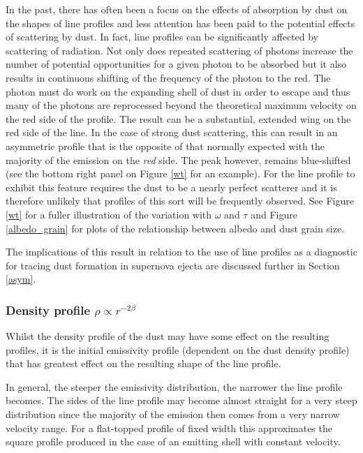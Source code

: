 \documentclass[useAMS,usenatbib,usegraphicx]{mnras}
\begin{document}
In the past, there has often been a focus on the effects of absorption by dust 
on the shapes of line profiles and less attention has been paid to the 
potential effects of scattering by dust.  In fact, line profiles 
can be significantly affected by scattering of radiation.  Not only does 
repeated scattering of photons increase the number of potential 
opportunities for a given photon to be absorbed but it also results in 
continuous shifting of the frequency of the photon to the red.  The photon 
must do work on the expanding shell of dust in order to escape and thus 
many of the photons are reprocessed beyond the theoretical maximum 
velocity on the red side of the profile.  The result can be a substantial, 
extended wing on the red side of the line.  In the case of strong 
dust scattering, this can result in an asymmetric profile that is the opposite 
of that normally expected with the majority of the emission on the 
\textit{red} side.  The peak however, remains blue-shifted (see the bottom right panel on Figure \ref{wt} for an example).  
For the line profile to exhibit this feature requires the dust to be a 
nearly perfect scatterer and it is therefore unlikely that profiles of this sort will be
frequently observed.  See Figure \ref{wt} for a fuller illustration of the variation
with $\omega$ and $\tau$ and Figure \ref{albedo_grain} for plots of the relationship between albedo and dust grain size.

The implications of this result in relation to the use of line profiles as 
a diagnostic for tracing dust formation in supernova ejecta 
are discussed further in Section \ref{asym}.


\subsubsection{Density profile $\rho \propto r^{-2\beta}$}
\label{beta}

Whilst the density profile of the dust may have some effect on the 
resulting profiles, it is the initial emissivity profile (dependent on the 
dust density profile) that has greatest effect on the resulting shape of 
the line profile.

In general, the steeper the emissivity distribution, the narrower the line 
profile becomes.  The sides of the line profile may become almost straight 
for a very steep distribution since the majority of the emission then 
comes from a very narrow velocity range.  For a flat-topped profile of 
fixed width this approximates the square profile produced in the case of 
an emitting shell with constant velocity.
\end{document}
